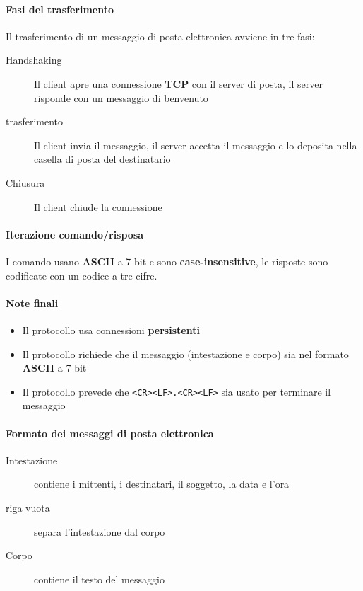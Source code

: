         \paragraph{Fasi del trasferimento} Il trasferimento di un messaggio di posta elettronica avviene in tre fasi:
            \begin{description}
                \item[Handshaking] Il client apre una connessione \textbf{TCP} con il server di posta, il server risponde con un messaggio di benvenuto
                \item[trasferimento] Il client invia il messaggio, il server accetta il messaggio e lo deposita nella casella di posta del destinatario
                \item[Chiusura] Il client chiude la connessione
            \end{description}
        \paragraph{Iterazione comando/risposa} I comando usano \textbf{ASCII} a 7 bit e sono \textbf{case-insensitive}, le risposte sono codificate con un codice a tre cifre.
        \paragraph{Note finali} 
            \begin{itemize}
                \item Il protocollo usa connessioni \textbf{persistenti}
                \item Il protocollo richiede che il messaggio (intestazione e corpo) sia nel formato \textbf{ASCII} a 7 bit
                \item Il protocollo prevede che \texttt{<CR><LF>.<CR><LF>} sia usato per terminare il messaggio
            \end{itemize}
        \paragraph{Formato dei messaggi di posta elettronica}
            \begin{description}
                \item[Intestazione]contiene i mittenti, i destinatari, il soggetto, la data e l'ora
                \item[riga vuota] separa l'intestazione dal corpo
                \item[Corpo] contiene il testo del messaggio
            \end{description}
